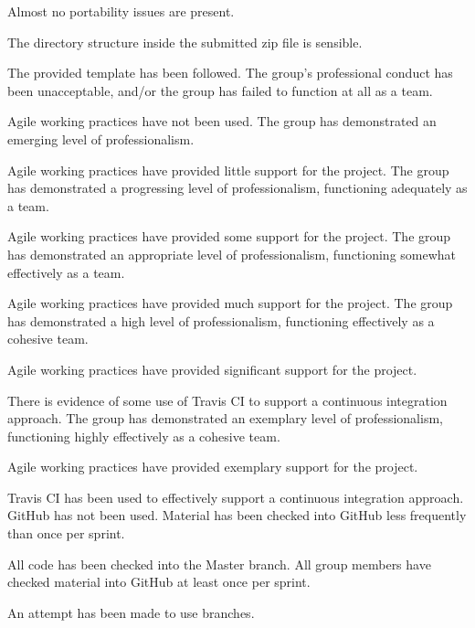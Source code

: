 \documentclass{../fal_assignment}
\begin{document}
\begin{markingrubric}
        \grade Almost no portability issues are present.
            \par The directory structure inside the submitted zip file is sensible.
            \par The provided template has been followed.
        \grade\fail The group's professional conduct has been unacceptable,
            and/or the group has failed to function at all as a team.
            \par Agile working practices have not been used.
        \grade The group has demonstrated an emerging level of professionalism.
            \par Agile working practices have provided little support for the project.
        \grade The group has demonstrated a progressing level of professionalism,
            functioning adequately as a team.
            \par Agile working practices have provided some support for the project.
        \grade The group has demonstrated an appropriate level of professionalism,
            functioning somewhat effectively as a team.
            \par Agile working practices have provided much support for the project.
        \grade The group has demonstrated a high level of professionalism,
            functioning effectively as a cohesive team.
            \par Agile working practices have provided significant support for the project.
            \par There is evidence of some use of Travis CI to support a continuous integration approach.
        \grade The group has demonstrated an exemplary level of professionalism,
            functioning highly effectively as a cohesive team.
            \par Agile working practices have provided exemplary support for the project.
            \par Travis CI has been used to effectively support a continuous integration approach.
        \grade\fail GitHub has not been used.
        \grade Material has been checked into GitHub less frequently than once per sprint.
            \par All code has been checked into the Master branch.
        \grade All group members have checked material into GitHub at least once per sprint.
            \par An attempt has been made to use branches.

\end{markingrubric}
\end{document}

